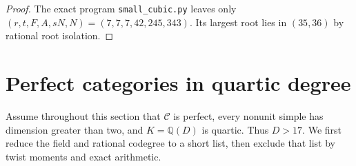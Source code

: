 \documentclass[11pt,a4paper]{article}
\numberwithin{equation}{section}
\begin{document}
\begin{proof}
The exact program \texttt{small\_cubic.py} leaves only $(r,t,F,A,sN,N)=(7,7,7,42,245,343)$. Its largest root lies in $(35,36)$ by rational root isolation.
\end{proof}




\section{Perfect categories in quartic degree}
\label{sec:residual-fields}
Assume throughout this section that $\mathcal C$ is perfect, every
nonunit simple has dimension greater than two, and $K=\mathbb Q(D)$
is quartic. Thus $D>17$. We first reduce the field and rational
codegree to a short list, then exclude that list by twist moments
and exact arithmetic.
\end{document}

